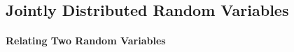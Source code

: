 \documentclass[6008notes.tex]{subfiles}
\begin{document}
\graphicspath{ {images/jointdist/} }

\subsection{Jointly Distributed Random Variables}

\paragraph{Relating Two Random Variables}
\end{document}
